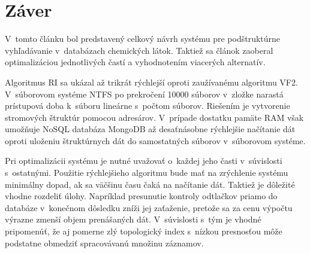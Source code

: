 \documentclass[slovak]{ExcelAtFIT} %
\begin{document}
\section{Záver}
\label{sec:Conclusions}

V~tomto článku bol predstavený celkový návrh systému pre podštruktúrne vyhľadávanie v~databázach che\-mic\-kých látok. Taktiež sa článok zaoberal optimalizáciou jednotlivých častí a vyhodnotením viacerých alternatív.

Algoritmus RI sa ukázal až trikrát rýchlejší oproti zaužívanému algoritmu VF2. V~súborovom systéme NTFS po prekročení 10000 súborov v~zložke narastá prístupová doba k~súboru lineárne s~počtom súborov. Riešením je vytvorenie stromových štruktúr pomocou adresárov. V~prípade dostatku pamäte RAM však umožňuje NoSQL databáza MongoDB až de\-sať\-ná\-sob\-ne rýchlejšie načítanie dát oproti uloženiu štruktúrnych dát do samostatných súborov v~súborovom systéme. 

Pri optimalizácii systému je nutné uvažovať o~kaž\-dej jeho časti v~súvislosti s~ostatnými. Použitie rý\-chlej\-šie\-ho algoritmu bude mať na zrýchlenie systému minimálny dopad, ak sa väčšinu času čaká na načítanie dát. Taktiež je dôležité vhodne rozdeliť úlohy. Na\-prí\-klad presunutie kontroly odtlačkov priamo do databáze v~konečnom dôsledku zníži jej zaťaženie, pretože sa za cenu výpočtu výrazne zmenší objem prenášaných dát. V~súvislosti s~tým je vhodné pripomenúť, že aj pomerne zlý topologický index s~nízkou presnosťou môže podstatne obmedziť spracovávanú množinu záznamov.
\end{document}
